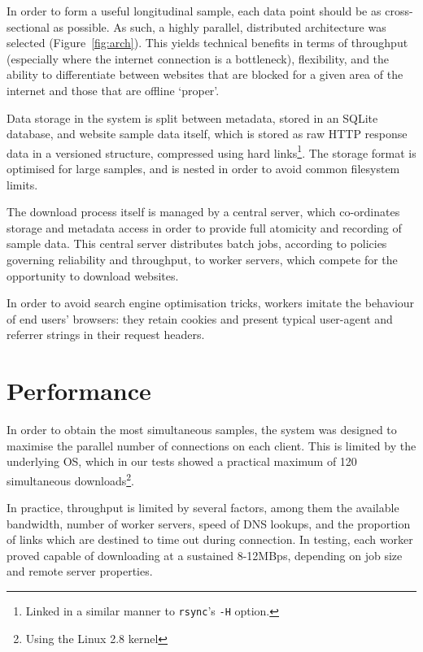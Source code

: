 \documentclass[11pt]{article}
\begin{document}
In order to form a useful longitudinal sample, each data point should be as cross-sectional as possible.  As such, a highly parallel, distributed architecture was selected (Figure~\ref{fig:arch}).  This yields technical benefits in terms of throughput (especially where the internet connection is a bottleneck), flexibility, and the ability to differentiate between websites that are blocked for a given area of the internet and those that are offline `proper'.

Data storage in the system is split between metadata, stored in an SQLite database, and website sample data itself, which is stored as raw HTTP response data in a versioned structure, compressed using hard links\footnote{Linked in a similar manner to \texttt{rsync}'s \texttt{-H} option.}.  The storage format is optimised for large samples, and is nested in order to avoid common filesystem limits.

The download process itself is managed by a central server, which co-ordinates storage and metadata access in order to provide full atomicity and recording of sample data.  This central server distributes batch jobs, according to policies governing reliability and throughput, to worker servers, which compete for the opportunity to download websites.

In order to avoid search engine optimisation tricks, workers imitate the behaviour of end users' browsers: they retain cookies and present typical user-agent and referrer strings in their request headers.

\section{Performance}
In order to obtain the most simultaneous samples, the system was designed to maximise the parallel number of connections on each client.  This is limited by the underlying OS, which in our tests showed a practical maximum of 120 simultaneous downloads\footnote{Using the Linux 2.8 kernel}.

In practice, throughput is limited by several factors, among them the available bandwidth, number of worker servers, speed of DNS lookups, and the proportion of links which are destined to time out during connection.  In testing, each worker proved capable of downloading at a sustained 8-12MBps, depending on job size and remote server properties.
\end{document}
